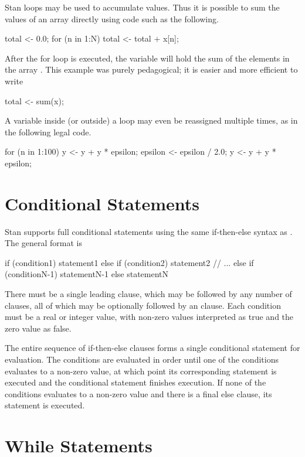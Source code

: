 Stan loops may be used to accumulate values.  Thus it is possible to
sum the values of an array directly using code such as the
following.
%
\begin{stancode}
total <- 0.0;
for (n in 1:N)
  total <- total + x[n];
\end{stancode}
%
After the for loop is executed, the variable  will hold
the sum of the elements in the array .  This example was
purely pedagogical; it is easier and more efficient to write
%
\begin{stancode}
total <- sum(x);
\end{stancode}

A variable inside (or outside) a loop may even be reassigned multiple
times, as in the following legal code.
%
\begin{stancode}
for (n in 1:100) {
  y <- y + y * epsilon;
  epsilon <- epsilon / 2.0;
  y <- y + y * epsilon;
}
\end{stancode}

\section{Conditional Statements}

Stan supports full conditional statements using
the same if-then-else syntax as \Cpp.  The general format is
%
\begin{stancode}
if (condition1)
  statement1
else if (condition2)
  statement2
// ...
else if (conditionN-1)
  statementN-1
else
  statementN
\end{stancode}
%
There must be a single leading  clause, which may be followed
by any number of  clauses, all of which may be
optionally followed by an  clause.  Each condition must be
a real or integer value, with non-zero values interpreted as true and
the zero value as false.

The entire sequence of if-then-else clauses forms a single conditional
statement for evaluation.  The conditions are evaluated in order
until one of the conditions evaluates to a non-zero value, at which
point its corresponding statement is executed and the conditional
statement finishes execution.  If none of the conditions evaluates to
a non-zero value and there is a final else clause, its statement is
executed.

\section{While Statements}

